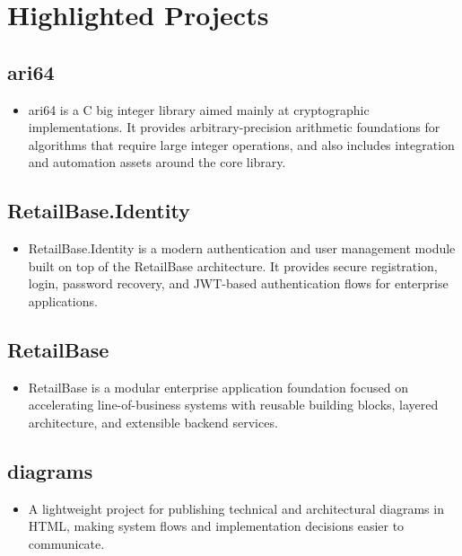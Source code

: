 \section*{Highlighted Projects}
\subsection*{ari64}
\begin{itemize}[leftmargin=12pt]
    \item ari64 is a C big integer library aimed mainly at cryptographic implementations. It provides arbitrary-precision arithmetic foundations for algorithms that require large integer operations, and also includes integration and automation assets around the core library.
\end{itemize}

\subsection*{RetailBase.Identity}
\begin{itemize}[leftmargin=12pt]
    \item RetailBase.Identity is a modern authentication and user management module built on top of the RetailBase architecture. It provides secure registration, login, password recovery, and JWT-based authentication flows for enterprise applications.
\end{itemize}

\subsection*{RetailBase}
\begin{itemize}[leftmargin=12pt]
    \item RetailBase is a modular enterprise application foundation focused on accelerating line-of-business systems with reusable building blocks, layered architecture, and extensible backend services.
\end{itemize}

\subsection*{diagrams}
\begin{itemize}[leftmargin=12pt]
    \item A lightweight project for publishing technical and architectural diagrams in HTML, making system flows and implementation decisions easier to communicate.
\end{itemize}

